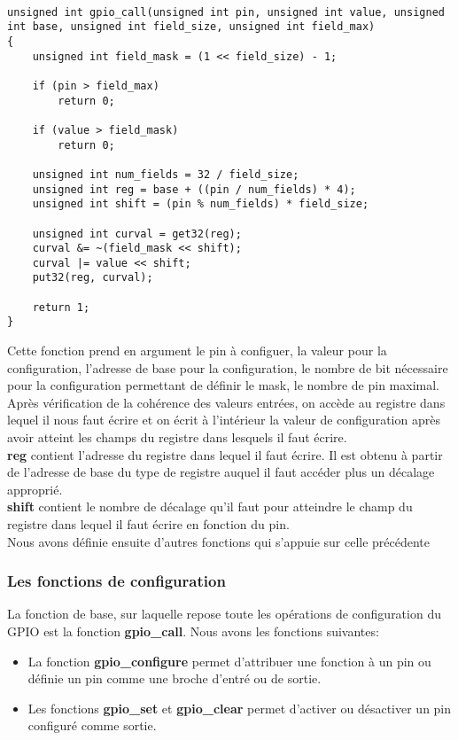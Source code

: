 \documentclass[12pt,a4paper,oneside]{book}
\begin{document}
\begin{lstlisting}

unsigned int gpio_call(unsigned int pin, unsigned int value, unsigned int base, unsigned int field_size, unsigned int field_max) 
{
    unsigned int field_mask = (1 << field_size) - 1;
  
    if (pin > field_max) 
        return 0;
    
    if (value > field_mask) 
        return 0; 

    unsigned int num_fields = 32 / field_size;
    unsigned int reg = base + ((pin / num_fields) * 4);
    unsigned int shift = (pin % num_fields) * field_size;

    unsigned int curval = get32(reg);
    curval &= ~(field_mask << shift);
    curval |= value << shift;
    put32(reg, curval);

    return 1;
}

\end{lstlisting}
Cette fonction prend en argument le pin à configuer, la valeur pour la configuration, l'adresse de base pour la configuration, le nombre de bit nécessaire pour la configuration permettant de définir le mask, le nombre de pin maximal.\\
Après vérification de la cohérence des valeurs entrées, on accède au registre dans lequel il nous faut écrire et on écrit à l'intérieur la valeur de configuration après avoir atteint les champs du registre dans lesquels il faut écrire.\\
\textbf{reg} contient l'adresse du registre dans lequel il faut écrire. Il est obtenu à partir de l'adresse de base du type de registre auquel il faut accéder plus un décalage approprié.\\
\textbf{shift} contient le nombre de décalage qu'il faut pour atteindre le champ du registre dans lequel il faut écrire en fonction du pin.\\

Nous avons définie ensuite d'autres fonctions qui s'appuie sur celle précédente 

\subsubsection{Les fonctions de configuration}
La fonction de base, sur laquelle repose toute les opérations de configuration du GPIO est la fonction \textbf{gpio\_call}.
Nous avons les fonctions suivantes:
\begin{itemize} 
	\item La fonction \textbf{gpio\_configure} permet d'attribuer une fonction à un pin ou définie un pin comme une broche d'entré ou de sortie.\\
	\item Les fonctions \textbf{gpio\_set} et \textbf{gpio\_clear} permet d'activer ou désactiver un pin configuré comme sortie. \\
\end{itemize}
\end{document}
